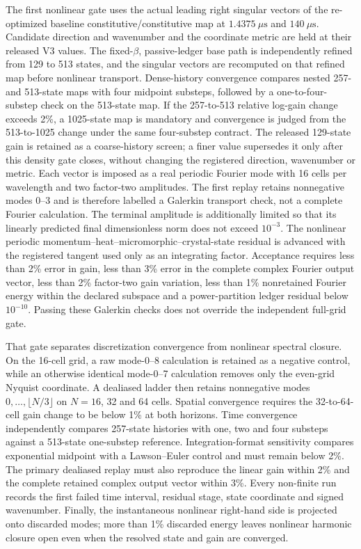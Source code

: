 The first nonlinear gate uses the actual leading right singular vectors of the
re-optimized baseline constitutive/constitutive map at $1.4375~\mu\mathrm s$
and $140~\mu\mathrm s$.  Candidate direction and wavenumber and the coordinate
metric are held at their released V3 values.  The fixed-$\beta$, passive-ledger base path
is independently refined from 129 to 513 states, and the singular vectors are
recomputed on that refined map before nonlinear transport.  Dense-history
convergence compares nested 257- and 513-state maps with four midpoint
substeps, followed by a one-to-four-substep check on the 513-state map.  If
the 257-to-513 relative log-gain change exceeds 2\%, a 1025-state map is
mandatory and convergence is judged from the 513-to-1025 change under the
same four-substep contract.  The released 129-state gain is retained as a
coarse-history screen; a finer value supersedes it only after this density
gate closes, without changing the registered direction, wavenumber or metric.
Each vector is imposed as a
real periodic Fourier mode
with 16 cells per wavelength and two factor-two amplitudes.  The first replay
retains nonnegative modes 0--3 and is therefore labelled a Galerkin transport
check, not a complete Fourier calculation.  The terminal
amplitude is additionally limited so that its linearly predicted final
dimensionless norm does not exceed $10^{-3}$. The nonlinear periodic
momentum--heat--micromorphic--crystal-state residual is advanced with the
registered tangent used only as an integrating factor. Acceptance requires
less than 2\% error in gain, less than 3\% error in the complete complex
Fourier output vector, less than 2\% factor-two gain variation, less than 1\%
nonretained Fourier energy within the declared subspace and a power-partition
ledger residual below $10^{-10}$.  Passing these Galerkin checks does not
override the independent full-grid gate.

That gate separates discretization convergence from nonlinear spectral
closure.  On the 16-cell grid, a raw mode-0--8 calculation is retained as a
negative control, while an otherwise identical mode-0--7 calculation removes
only the even-grid Nyquist coordinate.  A dealiased ladder then retains
nonnegative modes $0,\ldots,\lfloor N/3\rfloor$ on $N=16$, 32 and 64 cells.
Spatial convergence requires the 32-to-64-cell gain change to be below 1\% at
both horizons.  Time convergence independently compares 257-state histories
with one, two and four substeps against a 513-state one-substep reference.
Integration-format sensitivity compares exponential midpoint with a
Lawson--Euler control and must remain below 2\%.  The primary dealiased replay
must also reproduce the linear gain within 2\% and the complete retained
complex output vector within 3\%.  Every non-finite run records the first
failed time interval, residual stage, state coordinate and signed
wavenumber.  Finally, the instantaneous nonlinear right-hand side is projected
onto discarded modes; more than 1\% discarded energy leaves nonlinear
harmonic closure open even when the resolved state and gain are converged.

